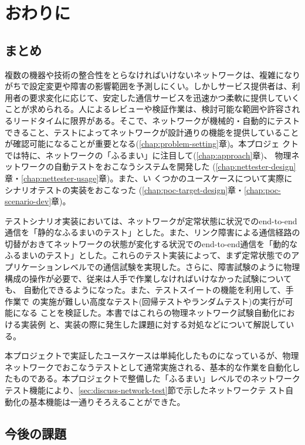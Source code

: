 
\chapter{おわりに}

 \section{まとめ}
 \label{sec:summary}

複数の機器や技術の整合性をとらなければいけないネットワークは、複雑になり
がちで設定変更や障害の影響範囲を予測しにくい。しかしサービス提供者は、利
用者の要求変化に応じて、安定した通信サービスを迅速かつ柔軟に提供していく
ことが求められる。人によるレビューや検証作業は、検討可能な範囲や許容され
るリードタイムに限界がある。そこで、ネットワークが機械的・自動的にテスト
できること、テストによってネットワークが設計通りの機能を提供していること
が確認可能になることが重要となる(\ref{chap:problem-setting}章)。本プロジェ
クトでは特に、ネットワークの「ふるまい」に注目して(\ref{chap:approach}章)、
物理ネットワークの自動テストをおこなうシステムを開発した
(\ref{chap:nettester-design}章・\ref{chap:nettester-usage}章)。また、い
くつかのユースケースについて実際にシナリオテストの実装をおこなった
(\ref{chap:poc-target-design}章・\ref{chap:poc-scenario-dev}章)。

テストシナリオ実装においては、ネットワークが定常状態に状況でのend-to-end
通信を「静的なふるまいのテスト」とした。また、リンク障害による通信経路の
切替がおきてネットワークの状態が変化する状況でのend-to-end通信を「動的な
ふるまいのテスト」とした。これらのテスト実装によって、まず定常状態でのア
プリケーションレベルでの通信試験を実現した。さらに、障害試験のように物理
構成の操作が必要で、従来は人手で作業しなければいけなかった試験についても、
自動化できるようになった。また、テストスイートの機能を利用して、手作業で
の実施が難しい高度なテスト(回帰テストやランダムテスト)の実行が可能になる
ことを検証した。本書ではこれらの物理ネットワーク試験自動化における実装例
と、実装の際に発生した課題に対する対処などについて解説している。

本プロジェクトで実証したユースケースは単純化したものになっているが、物理
ネットワークでおこなうテストとして通常実施される、基本的な作業を自動化し
たものである。本プロジェクトで整備した「ふるまい」レベルでのネットワーク
テスト機能により、\ref{sec:discuss-network-test}節で示したネットワークテ
スト自動化の基本機能は一通りそろえることができた。

 \section{今後の課題}
 \label{sec:future-work}

